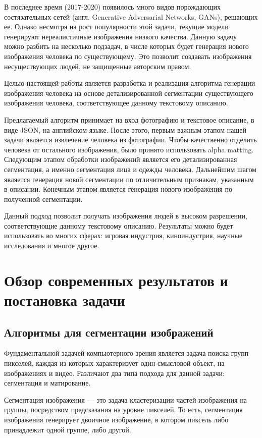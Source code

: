 \documentclass[times,specification,annotation]{itmo-student-thesis}
\begin{document}
В последнее время (2017-2020) появилось много видов порождающих состязательных сетей (англ. Generative Adversarial Networks, GANs), решающих ее. Однако несмотря на рост популярности этой задачи, текущие модели генерируют нереалистичные изображения низкого качества. 
Данную задачу можно разбить на несколько подзадач, в числе которых будет генерация нового изображения человека по существующему. Это позволит создавать изображения несуществующих людей, не защищенные авторским правом.

Целью настоящей работы является разработка и реализация алгоритма генерации изображения человека на основе детализированной сегментации существующего изображения человека, соответствующее данному текстовому описанию.

Предлагаемый алгоритм принимает на вход фотографию и текстовое описание, в виде JSON, на английском языке. После этого, первым важным этапом нашей задачи является извлечение человека из фотографии. Чтобы качественно отделить человека от остального изображения, было принято использовать alpha matting. Следующим этапом обработки изображений является его детализированная сегментация, а именно сегментация лица и одежды человека. Дальнейшим шагом является генерация новой сегментации по отличительным признакам, указанным в описании. Конечным этапом является генерация нового изображения по полученной сегментации. 

Данный подход позволит получать изображения людей в высоком разрешении, соответствующие данному текстовому описанию. Результаты можно будет использовать во многих сферах: игровая индустрия, киноиндустрия, научные исследования и многое другое. 

\chapter{Обзор современных результатов и постановка задачи}

\section{Алгоритмы для сегментации изображений}\label{sec:1}

Фундаментальной задачей компьютерного зрения является задача поиска групп пикселей, каждая из которых характеризует один смысловой объект, на изображениях и видео. 
Различают два типа подхода для данной задачи: сегментация и матирование.

Сегментация изображения — это задача кластеризации частей изображения на группы, посредством предсказания на уровне пикселей. То есть, сегментация изображения генерирует двоичное изображение, в котором пиксель либо принадлежит одной группе, либо другой.
\end{document}

